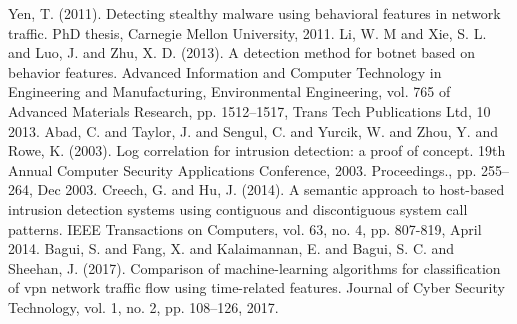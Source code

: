 \documentclass[conference]{IEEEtran}
\begin{document}
\begin{thebibliography}{00}
 Yen, T. (2011). Detecting stealthy malware using behavioral features in network traffic. PhD thesis, Carnegie Mellon University, 2011.
 Li, W. M and Xie, S. L. and Luo, J. and Zhu, X. D. (2013). A detection method for botnet based on behavior features. Advanced Information and Computer Technology in Engineering and Manufacturing, Environmental Engineering, vol. 765 of Advanced Materials Research, pp. 1512–1517, Trans Tech Publications Ltd, 10 2013.
 Abad, C. and Taylor, J. and Sengul, C.  and Yurcik, W. and Zhou, Y. and Rowe, K. (2003). Log correlation for intrusion detection: a proof of concept. 19th Annual Computer Security Applications Conference, 2003. Proceedings., pp. 255–264, Dec 2003.
 Creech, G. and Hu, J. (2014). A semantic approach to host-based intrusion detection systems using contiguous and discontiguous system call patterns. IEEE Transactions on Computers, vol. 63, no. 4, pp. 807-819, April 2014.
 Bagui, S. and Fang, X. and Kalaimannan, E. and Bagui, S. C. and Sheehan, J. (2017). Comparison of machine-learning algorithms for classification of vpn network traffic flow using time-related features. Journal of Cyber Security Technology, vol. 1, no. 2, pp. 108–126, 2017.
\end{thebibliography}

\vspace{12pt}
\color{red}
\end{document}
